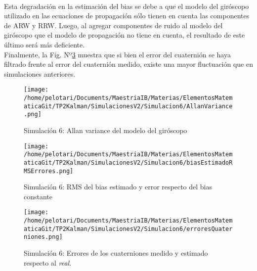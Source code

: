 \documentclass[a4paper,11pt,twoside]{IT-CNEA}
\begin{document}
\\ Esta degradación en la estimación del bias se debe a que el modelo del giróscopo utilizado en las ecuaciones de propagación sólo tienen en cuenta las componentes de ARW y RRW. Luego, al agregar componentes de ruido al modelo del giróscopo que el modelo de propagación no tiene en cuenta, el resultado de este último será más deficiente.  
\\ Finalmente, la Fig. Nº\ref{fig:Simulacion6/erroresQuaterniones} muestra que si bien el error del cuaternión se haya filtrado frente al error del cuaternión medido, existe una mayor fluctuación que en simulaciones anteriores. 
\begin{figure}[h!]
\centering
\texttt{[image: /home/pelotari/Documents/MaestriaIB/Materias/ElementosMatematicaGit/TP2Kalman/SimulacionesV2/Simulacion6/AllanVariance.png]}
\caption{Simulación 6:  Allan variance del modelo del giróscopo}
\label{fig:Simulacion6/AllanVariance}
\end{figure}
\begin{figure}[h!]
\centering
\texttt{[image: /home/pelotari/Documents/MaestriaIB/Materias/ElementosMatematicaGit/TP2Kalman/SimulacionesV2/Simulacion6/biasEstimadoRMSErrores.png]}
\caption{Simulación 6:  RMS del bias estimado y error respecto del bias constante}
\label{fig:Simulacion6/biasEstimadoRMSErrores}
\end{figure}
\begin{figure}[h!]
\centering
\texttt{[image: /home/pelotari/Documents/MaestriaIB/Materias/ElementosMatematicaGit/TP2Kalman/SimulacionesV2/Simulacion6/erroresQuaterniones.png]}
\caption{Simulación 6:  Errores de los cuaterniones medido y estimado respecto al \textit{real}.}
\label{fig:Simulacion6/erroresQuaterniones}
\end{figure}
\end{document}
